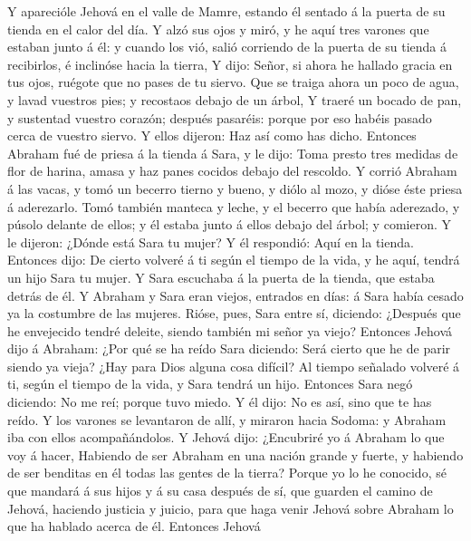  Y aparecióle Jehová en el valle de Mamre, estando él
sentado á la puerta de su tienda en el calor del día.  Y
alzó sus ojos y miró, y he aquí tres varones que estaban junto á él: y
cuando los vió, salió corriendo de la puerta de su tienda á recibirlos,
é inclinóse hacia la tierra,  Y dijo: Señor, si ahora he
hallado gracia en tus ojos, ruégote que no pases de tu siervo.
 Que se traiga ahora un poco de agua, y lavad vuestros
pies; y recostaos debajo de un árbol,  Y traeré un bocado
de pan, y sustentad vuestro corazón; después pasaréis: porque por eso
habéis pasado cerca de vuestro siervo. Y ellos dijeron: Haz así como has
dicho.  Entonces Abraham fué de priesa á la tienda á Sara,
y le dijo: Toma presto tres medidas de flor de harina, amasa y haz panes
cocidos debajo del rescoldo.  Y corrió Abraham á las
vacas, y tomó un becerro tierno y bueno, y diólo al mozo, y dióse éste
priesa á aderezarlo.  Tomó también manteca y leche, y el
becerro que había aderezado, y púsolo delante de ellos; y él estaba
junto á ellos debajo del árbol; y comieron.  Y le dijeron:
¿Dónde está Sara tu mujer? Y él respondió: Aquí en la tienda.
 Entonces dijo: De cierto volveré á ti según el tiempo de
la vida, y he aquí, tendrá un hijo Sara tu mujer. Y Sara escuchaba á la
puerta de la tienda, que estaba detrás de él.  Y Abraham
y Sara eran viejos, entrados en días: á Sara había cesado ya la
costumbre de las mujeres.  Rióse, pues, Sara entre sí,
diciendo: ¿Después que he envejecido tendré deleite, siendo también mi
señor ya viejo?  Entonces Jehová dijo á Abraham: ¿Por qué
se ha reído Sara diciendo: Será cierto que he de parir siendo ya vieja?
 ¿Hay para Dios alguna cosa difícil? Al tiempo señalado
volveré á ti, según el tiempo de la vida, y Sara tendrá un hijo.
 Entonces Sara negó diciendo: No me reí; porque tuvo
miedo. Y él dijo: No es así, sino que te has reído.  Y
los varones se levantaron de allí, y miraron hacia Sodoma: y Abraham iba
con ellos acompañándolos.  Y Jehová dijo: ¿Encubriré yo á
Abraham lo que voy á hacer,  Habiendo de ser Abraham en
una nación grande y fuerte, y habiendo de ser benditas en él todas las
gentes de la tierra?  Porque yo lo he conocido, sé que
mandará á sus hijos y á su casa después de sí, que guarden el camino de
Jehová, haciendo justicia y juicio, para que haga venir Jehová sobre
Abraham lo que ha hablado acerca de él.  Entonces Jehová
